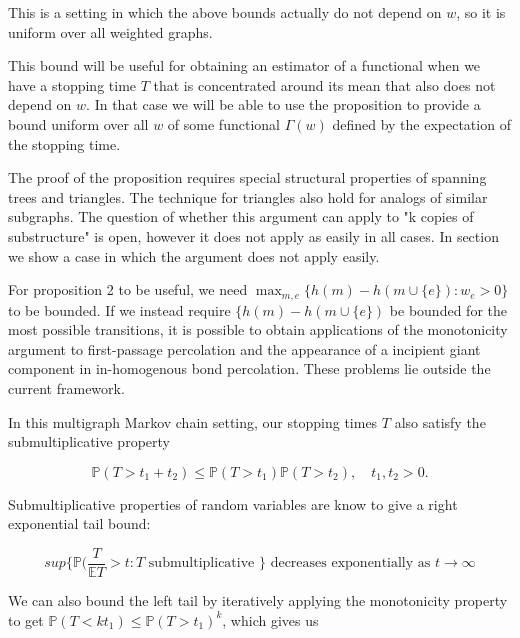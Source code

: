 This is a setting in which the above bounds actually do not depend on $w$, so it is uniform over all weighted graphs.  

This bound will be useful for obtaining an estimator of a functional when we have a stopping time $T$ that is concentrated around its mean that also does not depend on $w$.  In that case we will be able to use the proposition to provide a bound uniform over all $w$ of some functional $\Gamma(w)$ defined by the expectation of the stopping time.   

The proof of the proposition requires special structural properties of spanning trees and triangles.  The technique for triangles also hold for analogs of similar subgraphs. The question of whether this argument can apply to "k copies of substructure" is open, however it does not apply as easily in all cases.  In section we show a case in which the argument does not apply easily.

For proposition 2 to be useful, we need $ \max_{m, e}\{h(m) - h(m \cup \{e\}) : w_e > 0\}$ to be bounded.  If we instead require $\{h(m)-h(m\cup \{e\})$ be bounded for the most possible transitions, it is possible to obtain applications of the monotonicity argument to first-passage percolation\cite{david_FFP} and the appearance of a incipient giant component in in-homogenous bond percolation\cite{david_FFP}.  These problems lie outside the current framework.  

In this multigraph Markov chain setting, our stopping times $T$ also satisfy the submultiplicative property

\begin{equation}
\mathbb{P}(T > t_1+t_2) \leq \mathbb{P}(T > t_1)\mathbb{P}(T>t_2),\quad t_1, t_2 >0.
\end{equation}


Submultiplicative properties of random variables are know to give a right exponential tail bound:

\begin{equation}
sup\{\mathbb{P}(\frac{T}{\mathbb{E}T} > t : T \text{ submultiplicative } \} \text{ decreases exponentially as } t \rightarrow \infty
\end{equation}

We can also bound the left tail by iteratively applying the monotonicity property to get $\mathbb{P}(T < k t_1) \leq \mathbb{P}(T > t_1)^k$, which gives us 


